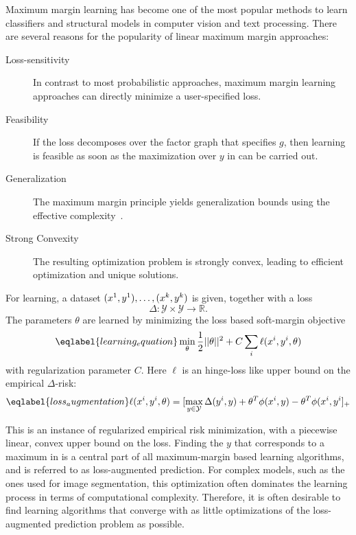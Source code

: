 Maximum margin learning has become one of the most popular methods to learn
classifiers and structural models in computer vision and text processing.
There are several reasons for the popularity of linear maximum margin approaches:
\begin{description}
    \item[Loss-sensitivity] In contrast to most probabilistic approaches, maximum margin learning approaches can directly
        minimize a user-specified loss.
    \item[Feasibility] If the loss decomposes over the factor graph that
        specifies $g$, then learning is feasible as soon as the maximization
        over $y$ in  can be carried out.
    \item[Generalization] The maximum margin principle yields generalization
        bounds using the effective complexity~\citep{taskar2003max}.
    \item[Strong Convexity] The resulting optimization problem is strongly
        convex, leading to efficient optimization and unique solutions.
\end{description}

For learning, a dataset $(x^{1}, y^{1}),\dotsc,(x^{k}, y^{k})$ is given, together with a loss
\begin{equation}
    \Delta \colon \mathcal{Y} \times \mathcal{Y} \rightarrow \mathbb{R}.
\end{equation}
The parameters $\theta$ are learned by minimizing the loss based soft-margin
objective
\begin{equation}\eqlabel{learning_equation}
    \min_\theta \frac{1}{2} ||\theta||^2 + C \sum_i  \ell(x\hoch{i}, y\hoch{i}, \theta)
\end{equation}
with regularization parameter $C$. Here $\ell$ is an hinge-loss like upper bound
on the empirical $\Delta$-risk:
\begin{equation}\eqlabel{loss_augmentation}
    \ell(x\hoch{i}, y\hoch{i}, \theta) = [\max_{y \in \mathcal{Y}} \Delta(y\hoch{i}, y) + \theta^T \phi(x\hoch{i}, y) - \theta^T \phi(x\hoch{i}, y\hoch{i}]_+
\end{equation}

This is an instance of regularized empirical risk minimization, with a
piecewise linear, convex upper bound on the loss. 
Finding the $y$ that corresponds to a maximum in  is
a central part of all maximum-margin based learning algorithms, and is referred to
as loss-augmented prediction. For complex models, such as the ones used for
image segmentation, this optimization often dominates the learning process in
terms of computational complexity.
Therefore, it is often desirable to find learning algorithms that converge with
as little optimizations of the loss-augmented prediction problem as possible.

